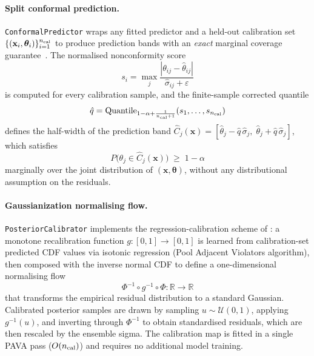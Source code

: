 \documentclass[review,12pt]{elsarticle}
\begin{document}
\paragraph{Split conformal prediction.}
\texttt{ConformalPredictor} wraps any fitted predictor and a held-out
calibration set $\{(\mathbf{x}_i, \boldsymbol{\theta}_i)\}_{i=1}^{n_{\rm cal}}$
to produce prediction bands with an \emph{exact} marginal coverage
guarantee~\citep{Vovk2005,Angelopoulos2023}.
The normalised nonconformity score
\begin{equation}
  s_i = \max_j
    \frac{|{\theta}_{ij} - \hat\theta_{ij}|}{\hat\sigma_{ij} + \varepsilon}
  \label{eq:nonconformity}
\end{equation}
is computed for every calibration sample, and the finite-sample corrected
quantile
\begin{equation}
  \hat{q} = \mathrm{Quantile}_{1-\alpha + \frac{1}{n_{\rm cal}+1}}
             (s_1,\ldots,s_{n_{\rm cal}})
  \label{eq:confquantile}
\end{equation}
defines the half-width of the prediction band
$\hat{C}_j(\mathbf{x}) = [\hat\theta_j - \hat{q}\,\hat\sigma_j,\;
  \hat\theta_j + \hat{q}\,\hat\sigma_j]$, which satisfies
\begin{equation}
  P\!\bigl(\theta_j \in \hat{C}_j(\mathbf{x})\bigr) \;\ge\; 1-\alpha
  \label{eq:confcoverage}
\end{equation}
marginally over the joint distribution of $(\mathbf{x},\boldsymbol\theta)$,
without any distributional assumption on the residuals.

\paragraph{Gaussianization normalising flow.}
\texttt{PosteriorCalibrator} implements the regression-calibration scheme
of \citet{Kuleshov2018}: a monotone recalibration function
$g:[0,1]\to[0,1]$ is learned from calibration-set predicted CDF values
via isotonic regression (Pool Adjacent Violators algorithm), then composed
with the inverse normal CDF to define a one-dimensional normalising flow
\begin{equation}
  \Phi^{-1}\circ g^{-1}\circ\Phi:\mathbb{R}\to\mathbb{R}
  \label{eq:gaussflow}
\end{equation}
that transforms the empirical residual distribution to a standard Gaussian.
Calibrated posterior samples are drawn by sampling
$u\sim\mathcal{U}(0,1)$, applying $g^{-1}(u)$, and inverting through
$\Phi^{-1}$ to obtain standardised residuals, which are then rescaled by
the ensemble sigma.
The calibration map is fitted in a single PAVA pass
($O(n_{\rm cal})$) and requires no additional model training.
\end{document}

